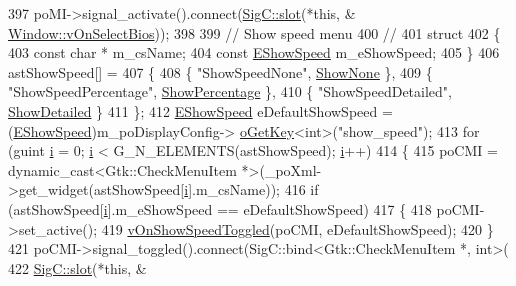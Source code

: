 \begin{DoxyCode}
{{397   poMI->signal\_activate().connect(\mbox{\hyperlink{namespace_sig_c_a92e4f19202b77e78ac1db05f5a62f6b6}{SigC::slot}}(*\textcolor{keyword}{this}, &
      \mbox{\hyperlink{class_v_b_a_1_1_window_a5d20c67c2118e4a18e97cab4ba111c65}{Window::vOnSelectBios}}));
398 
399   \textcolor{comment}{// Show speed menu}
400   \textcolor{comment}{//}
401   \textcolor{keyword}{struct}
402   \{
403     \textcolor{keyword}{const} \textcolor{keywordtype}{char} *     m\_csName;
404     \textcolor{keyword}{const} \mbox{\hyperlink{class_v_b_a_1_1_window_a9dfcf6d1a23c7576d357221d4bedda45}{EShowSpeed}} m\_eShowSpeed;
405   \}
406   astShowSpeed[] =
407   \{
408     \{ \textcolor{stringliteral}{"ShowSpeedNone"},       \mbox{\hyperlink{class_v_b_a_1_1_window_a9dfcf6d1a23c7576d357221d4bedda45af272aa72487b69bcd8b10a1e257c9b6d}{ShowNone}}       \},
409     \{ \textcolor{stringliteral}{"ShowSpeedPercentage"}, \mbox{\hyperlink{class_v_b_a_1_1_window_a9dfcf6d1a23c7576d357221d4bedda45ab47a93551a61f4a01ba95f1bb10b16ad}{ShowPercentage}} \},
410     \{ \textcolor{stringliteral}{"ShowSpeedDetailed"},   \mbox{\hyperlink{class_v_b_a_1_1_window_a9dfcf6d1a23c7576d357221d4bedda45a95a319265dead31c372adea02dd872ed}{ShowDetailed}}   \}
411   \};
412   \mbox{\hyperlink{class_v_b_a_1_1_window_a9dfcf6d1a23c7576d357221d4bedda45}{EShowSpeed}} eDefaultShowSpeed = (\mbox{\hyperlink{class_v_b_a_1_1_window_a9dfcf6d1a23c7576d357221d4bedda45}{EShowSpeed}})m\_poDisplayConfig->
      \mbox{\hyperlink{class_v_b_a_1_1_config_1_1_section_ab169d7aae4e9dde91418ba1668e3ad39}{oGetKey}}<\textcolor{keywordtype}{int}>(\textcolor{stringliteral}{"show\_speed"});
413   \textcolor{keywordflow}{for} (guint \mbox{\hyperlink{expr-lex_8cpp_acb559820d9ca11295b4500f179ef6392}{i}} = 0; \mbox{\hyperlink{expr-lex_8cpp_acb559820d9ca11295b4500f179ef6392}{i}} < G\_N\_ELEMENTS(astShowSpeed); \mbox{\hyperlink{expr-lex_8cpp_acb559820d9ca11295b4500f179ef6392}{i}}++)
414   \{
415     poCMI = \textcolor{keyword}{dynamic\_cast<}Gtk::CheckMenuItem *\textcolor{keyword}{>}(\_poXml->get\_widget(astShowSpeed[\mbox{\hyperlink{expr-lex_8cpp_acb559820d9ca11295b4500f179ef6392}{i}}].m\_csName));
416     \textcolor{keywordflow}{if} (astShowSpeed[\mbox{\hyperlink{expr-lex_8cpp_acb559820d9ca11295b4500f179ef6392}{i}}].m\_eShowSpeed == eDefaultShowSpeed)
417     \{
418       poCMI->set\_active();
419       \mbox{\hyperlink{class_v_b_a_1_1_window_a81a46aa6f68c512ed86aa04ca13dbd71}{vOnShowSpeedToggled}}(poCMI, eDefaultShowSpeed);
420     \}
421     poCMI->signal\_toggled().connect(SigC::bind<Gtk::CheckMenuItem *, int>(
422                                       \mbox{\hyperlink{namespace_sig_c_a92e4f19202b77e78ac1db05f5a62f6b6}{SigC::slot}}(*\textcolor{keyword}{this}, &
}}
\end{DoxyCode}
